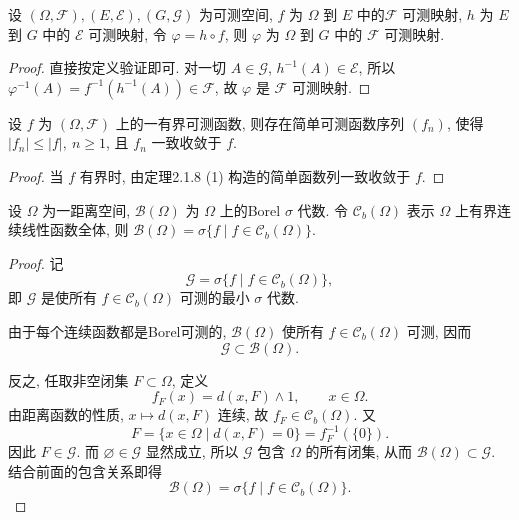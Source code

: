         \begin{2}
            设 $(\Omega,\mathcal{F}),(E,\mathcal{E}),(G,\mathcal{G})$ 为可测空间, 
            $f$ 为 $\Omega$ 到 $E$ 中的$\mathcal{F}$ 可测映射, 
            $h$ 为 $E$ 到 $G$ 中的 $\mathcal{E}$ 可测映射, 
            令 $\varphi=h\circ f$, 
            则 $\varphi$ 为 $\Omega$ 到 $G$ 中的 $\mathcal{F}$ 可测映射. 
        \end{2}
        \begin{proof}
            直接按定义验证即可. 
            对一切 $A\in\mathcal{G}$, 
            $h^{-1}(A)\in\mathcal{E}$, 
            所以 $\varphi^{-1}(A)=f^{-1}(h^{-1}(A))\in\mathcal{F}$, 
            故 $\varphi$ 是 $\mathcal{F}$ 可测映射. 
        \end{proof}
        \begin{3}
            设 $f$ 为 $(\Omega,\mathcal{F})$ 上的一有界可测函数, 
            则存在简单可测函数序列 $(f_n)$, 使得 $|f_n|\leqslant|f|,\ n\geqslant 1$, 
            且 $f_n$ 一致收敛于 $f$. 
        \end{3}
        \begin{proof}
            当 $f$ 有界时, 由定理2.1.8 (1) 构造的简单函数列一致收敛于 $f$. 
        \end{proof}
        \begin{5}
            设 $\Omega$ 为一距离空间, 
            $\mathcal{B}(\Omega)$ 为 $\Omega$ 上的Borel $\sigma$ 代数. 
            令 $\mathcal{C}_b(\Omega)$ 表示 $\Omega$ 上有界连续线性函数全体, 
            则 $\mathcal{B}(\Omega)=\sigma\{f\mid f\in \mathcal{C}_b(\Omega)\}$. 
        \end{5}
        \begin{proof}
            记
            \[
                \mathcal{G}=\sigma\{f\mid f\in\mathcal{C}_b(\Omega)\},
            \]
            即 $\mathcal{G}$ 是使所有 $f\in\mathcal{C}_b(\Omega)$ 可测的最小 $\sigma$ 代数.

            由于每个连续函数都是Borel可测的, 
            $\mathcal{B}(\Omega)$ 使所有
            $f\in\mathcal{C}_b(\Omega)$ 可测, 
            因而
            \[
                \mathcal{G}\subset\mathcal{B}(\Omega).
            \]

            反之, 
            任取非空闭集 $F\subset\Omega$, 
            定义
            \[
                f_F(x)=d(x,F)\wedge 1,\qquad x\in\Omega.
            \]
            由距离函数的性质, 
            $x\mapsto d(x,F)$ 连续, 
            故
            $f_F\in\mathcal{C}_b(\Omega)$. 
            又
            \[
                F=\{x\in\Omega\mid d(x,F)=0\}
                =f_F^{-1}(\{0\}).
            \]
            因此 $F\in\mathcal{G}$. 
            而 $\varnothing\in\mathcal{G}$ 显然成立, 
            所以 $\mathcal{G}$ 包含 $\Omega$ 的所有闭集, 
            从而 $\mathcal{B}(\Omega)\subset\mathcal{G}$. 
            结合前面的包含关系即得
            \[
                \mathcal{B}(\Omega)
                =\sigma\{f\mid f\in\mathcal{C}_b(\Omega)\}.
            \]
        \end{proof}
